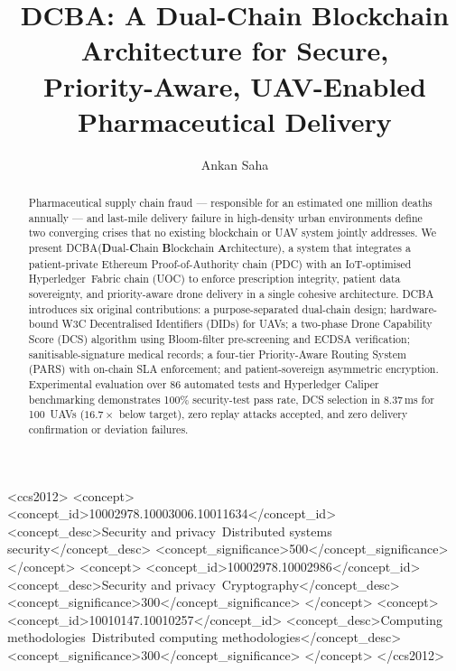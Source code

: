 \documentclass[sigplan,screen]{acmart}
\newcommand{\dcba}{\textsc{DCBA}\xspace}
\newcommand{\pdc}{PDC\xspace}
\newcommand{\uoc}{UOC\xspace}
\newcommand{\dcs}{\textsc{DCS}\xspace}
\newcommand{\pars}{\textsc{PARS}\xspace}
\begin{document}
\title{\dcba: A Dual-Chain Blockchain Architecture for Secure,\\
       Priority-Aware, UAV-Enabled Pharmaceutical Delivery}

\author{Ankan Saha}


\renewcommand{\shortauthors}{Saha}

\begin{abstract}
Pharmaceutical supply chain fraud — responsible for an estimated one million deaths
annually — and last-mile delivery failure in high-density urban environments define
two converging crises that no existing blockchain or UAV system jointly addresses.
We present \dcba (\textbf{D}ual-\textbf{C}hain \textbf{B}lockchain
\textbf{A}rchitecture), a system that integrates a patient-private Ethereum
Proof-of-Authority chain (\pdc) with an IoT-optimised Hyperledger~Fabric chain
(\uoc) to enforce prescription integrity, patient data sovereignty, and
priority-aware drone delivery in a single cohesive architecture.
\dcba introduces six original contributions: a purpose-separated dual-chain
design; hardware-bound W3C Decentralised Identifiers (DIDs) for UAVs; a
two-phase Drone Capability Score (\dcs) algorithm using Bloom-filter
pre-screening and ECDSA verification; sanitisable-signature medical records;
a four-tier Priority-Aware Routing System (\pars) with on-chain SLA
enforcement; and patient-sovereign asymmetric encryption.
Experimental evaluation over 86 automated tests and Hyperledger Caliper
benchmarking demonstrates 100\% security-test pass rate, DCS selection in
8.37\,ms for 100~UAVs ($16.7\times$ below target), zero replay attacks
accepted, and zero delivery confirmation or deviation failures.
\end{abstract}

\begin{CCSXML}
<ccs2012>
  <concept>
    <concept_id>10002978.10003006.10011634</concept_id>
    <concept_desc>Security and privacy~Distributed systems security</concept_desc>
    <concept_significance>500</concept_significance>
  </concept>
  <concept>
    <concept_id>10002978.10002986</concept_id>
    <concept_desc>Security and privacy~Cryptography</concept_desc>
    <concept_significance>300</concept_significance>
  </concept>
  <concept>
    <concept_id>10010147.10010257</concept_id>
    <concept_desc>Computing methodologies~Distributed computing methodologies</concept_desc>
    <concept_significance>300</concept_significance>
  </concept>
</ccs2012>
\end{CCSXML}
\end{document}
